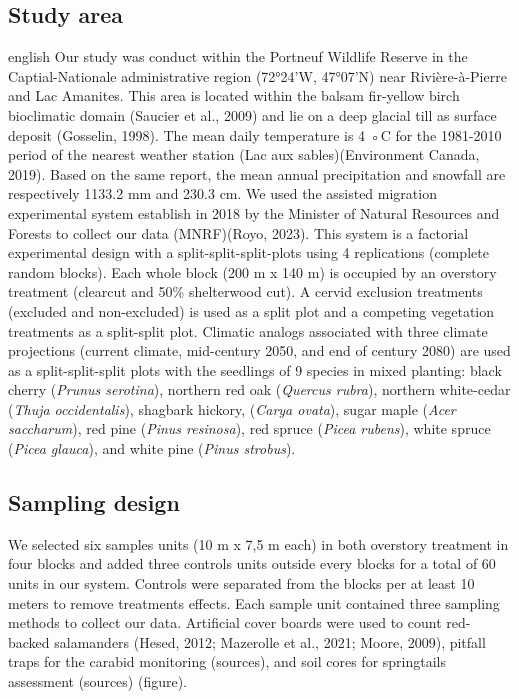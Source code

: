 \subsection*{Study area}
\label{subsec:area}

\begin{otherlanguage*}{english}
  Our study was conduct within the Portneuf Wildlife Reserve in the Captial-Nationale administrative region (72°24'W, 47°07'N) near Rivière-à-Pierre and Lac Amanites. 
  This area is located within the balsam fir-yellow birch bioclimatic domain (Saucier et al., 2009) and lie on a deep glacial till as surface deposit (Gosselin, 1998).
  The mean daily temperature is 4 ◦C for the 1981-2010 period of the nearest weather station (Lac aux sables)(Environment Canada, 2019). 
  Based on the same report, the mean annual precipitation and snowfall are respectively 1133.2 mm and 230.3 cm.
  We used the assisted migration experimental system establish in 2018 by the Minister of Natural Resources and Forests to collect our data (MNRF)(Royo, 2023).
  This system is a factorial experimental design with a split-split-split-plots using 4 replications (complete random blocks). 
  Each whole block (200 m x 140 m) is occupied by an overstory treatment (clearcut and 50\% shelterwood cut). 
  A cervid exclusion treatments (excluded and non-excluded) is used as a split plot and a competing vegetation treatments as a split-split plot. 
  Climatic analogs associated with three climate projections (current climate, mid-century 2050, and end of century 2080) 
  are used as a split-split-split plots with the seedlings of 9 species in mixed planting: black cherry (\textit{Prunus serotina}), northern red oak (\textit{Quercus rubra}), 
  northern white-cedar (\textit{Thuja occidentalis}), shagbark hickory, (\textit{Carya ovata}), sugar maple (\textit{Acer saccharum}), red pine (\textit{Pinus resinosa}), 
  red spruce (\textit{Picea rubens}), white spruce (\textit{Picea glauca}), and white pine (\textit{Pinus strobus}).

\end{otherlanguage*}


\subsection*{Sampling design}
\label{subsec:sampling}

We selected six samples units (10 m x 7,5 m each) in both overstory treatment in four blocks and added three controls units outside every blocks for a total of 60 units in our system. 
Controls were separated from the blocks per at least 10 meters to remove treatments effects.
Each sample unit contained three sampling methods to collect our data. 
Artificial cover boards were used to count red-backed salamanders (Hesed, 2012; Mazerolle et al., 2021; Moore, 2009), 
pitfall traps for the carabid monitoring (sources), and soil cores for springtails assessment (sources) (figure).

